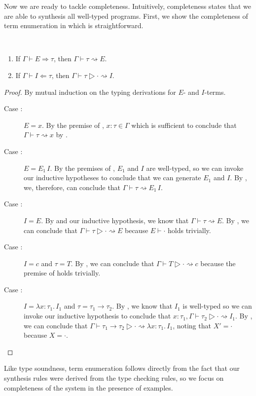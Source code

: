 Now we are ready to tackle completeness.
Intuitively, completeness states that we are able to synthesis all well-typed programs.
First, we show the completeness of term enumeration in \lsyn{} which is straightforward.
\begin{proofenv}
  \begin{lemma}\ %
  \label{lem:completeness-of-lsyn-term-enumeration}
    \begin{enumerate}
      \item If $Γ ⊢ E ⇒ τ$, then $Γ ⊢ τ ⇝ E$.
      \item If $Γ ⊢ I ⇐ τ$, then $Γ ⊢ τ ▷ · ⇝ I$.
    \end{enumerate}
  \end{lemma}
  \begin{proof}
    By mutual induction on the typing derivations for $E$- and $I$-terms.
    \begin{description}
      \item[Case :]
        $E = x$.
        By the premise of , $x{:}τ ∈ Γ$ which is sufficient to conclude that $Γ ⊢ τ ⇝ x$ by .
      \item[Case :]
        $E = E_1\,I$.
        By the premises of , $E_1$ and $I$ are well-typed, so we can invoke our inductive hypotheses to conclude that we can generate $E_1$ and $I$.
        By , we, therefore, can conclude that $Γ ⊢ τ ⇝ E_1\,I$.
      \item[Case :]
        $I = E$.
        By  and our inductive hypothesis, we know that $Γ ⊢ τ ⇝ E$.
        By , we can conclude that $Γ ⊢ τ ▷ · ⇝ E$ because $E ⊢ ·$ holds trivially.
      \item[Case :]
        $I = c$ and $τ = T$.
        By , we can conclude that $Γ ⊢ T ▷ · ⇝ c$ because the premise of  holds trivially.
      \item[Case :]
        $I = λx{:}τ_1.\,I_1$ and $τ = τ_1 → τ_2$.
        By , we know that $I_1$ is well-typed so we can invoke our inductive hypothesis to conclude that $x{:}τ_1, Γ ⊢ τ_2 ▷ · ⇝ I_1$.
        By , we can conclude that $Γ ⊢ τ_1 → τ_2 ▷ · ⇝ λx{:}τ_1.\,I_1$, noting that $Χ' = ·$ because $Χ = ·$.
    \end{description}
  \end{proof}
\end{proofenv}
Like type soundness, term enumeration follows directly from the fact that our synthesis rules were derived from the type checking rules, so we focus on
completeness of the system in the presence of examples.

